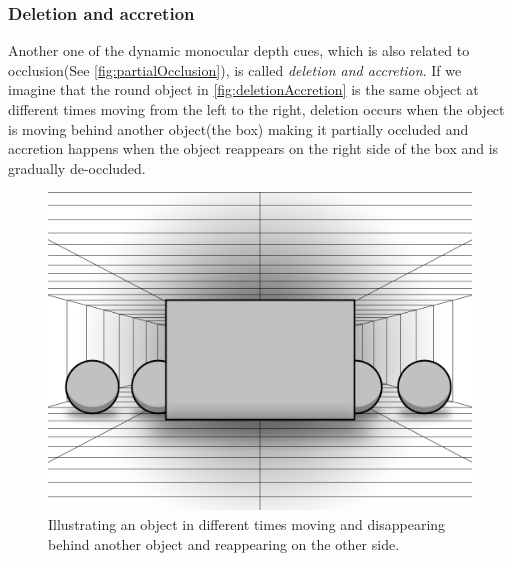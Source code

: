 \subsubsection{Deletion and accretion}
Another one of the dynamic monocular depth cues, which is also related to occlusion(See \autoref{fig:partialOcclusion}), is called \textit{deletion and accretion}. If we imagine that the round object in \autoref{fig:deletionAccretion} is the same object at different times moving from the left to the right, deletion occurs when the object is moving behind another object(the box) making it partially occluded and accretion happens when the object reappears on the right side of the box and is gradually de-occluded\citep[p.~207]{sensationPerception}.
\begin{figure}[H]
	\centering
	\includegraphics[width=0.8\linewidth]{figure/Analysis/deletionAccretion.png}
	\caption{Illustrating an object in different times moving and disappearing behind another object and reappearing on the other side.}
	\label{fig:deletionAccretion}
\end{figure}


